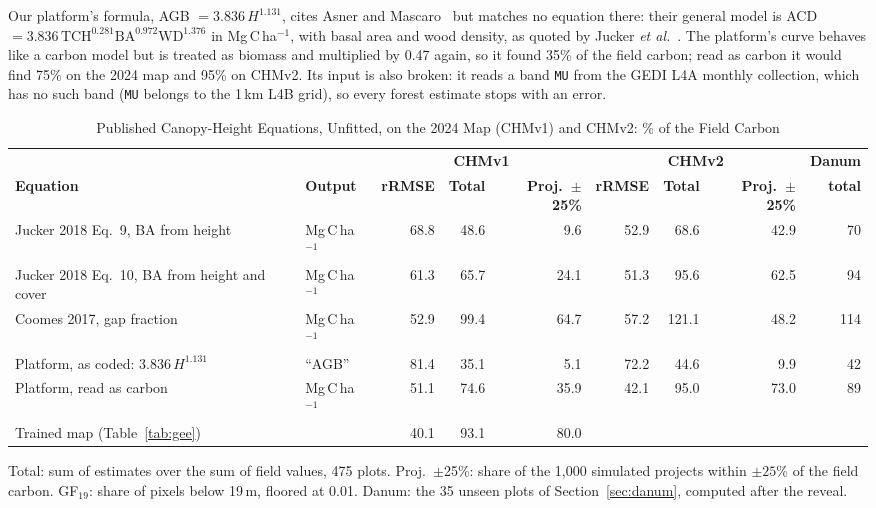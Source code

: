 \documentclass[conference,a4paper]{IEEEtran}
\begin{document}
Our platform's formula, AGB $=3.836\,H^{1.131}$, cites Asner and Mascaro~\cite{asner2014mapping} but matches no equation there: their general model is ACD $=3.836\,\mathrm{TCH}^{0.281}\mathrm{BA}^{0.972}\mathrm{WD}^{1.376}$ in Mg\,C\,ha$^{-1}$, with basal area and wood density, as quoted by Jucker \textit{et al.}~\cite{jucker2018estimating}. The platform's curve behaves like a carbon model but is treated as biomass and multiplied by 0.47 again, so it found 35\% of the field carbon; read as carbon it would find 75\% on the 2024 map and 95\% on CHMv2. Its input is also broken: it reads a band \texttt{MU} from the GEDI L4A monthly collection, which has no such band (\texttt{MU} belongs to the 1\,km L4B grid), so every forest estimate stops with an error.

\begin{table}[t]
\centering
\caption{Published Canopy-Height Equations, Unfitted, on the 2024 Map (CHMv1) and CHMv2: \% of the Field Carbon}
\label{tab:heighteq}
\footnotesize
\setlength{\tabcolsep}{4pt}
\begin{tabular}{@{}l l r r r r r r r@{}}
\toprule
 & & \multicolumn{3}{c}{\textbf{CHMv1}} & \multicolumn{3}{c}{\textbf{CHMv2}} & \textbf{Danum}\\
\textbf{Equation} & \textbf{Output} & \textbf{rRMSE} & \textbf{Total} & \textbf{Proj.\ $\pm$25\%} & \textbf{rRMSE} & \textbf{Total} & \textbf{Proj.\ $\pm$25\%} & \textbf{total}\\
\midrule
Jucker 2018 Eq.~9, BA from height & Mg\,C\,ha$^{-1}$ & 68.8 & 48.6 & 9.6 & 52.9 & 68.6 & 42.9 & 70\\
Jucker 2018 Eq.~10, BA from height and cover & Mg\,C\,ha$^{-1}$ & 61.3 & 65.7 & 24.1 & 51.3 & 95.6 & 62.5 & 94\\
Coomes 2017, gap fraction & Mg\,C\,ha$^{-1}$ & 52.9 & 99.4 & 64.7 & 57.2 & 121.1 & 48.2 & 114\\
Platform, as coded: $3.836\,H^{1.131}$ & ``AGB'' & 81.4 & 35.1 & 5.1 & 72.2 & 44.6 & 9.9 & 42\\
Platform, read as carbon & Mg\,C\,ha$^{-1}$ & 51.1 & 74.6 & 35.9 & 42.1 & 95.0 & 73.0 & 89\\
\midrule
Trained map (Table~\ref{tab:gee}) & & 40.1 & 93.1 & 80.0 & & & & \\
\bottomrule
\end{tabular}

\vspace{2pt}
{\scriptsize Total: sum of estimates over the sum of field values, 475 plots. Proj.\ $\pm$25\%: share of the 1{,}000 simulated projects within $\pm25$\% of the field carbon. GF$_{19}$: share of pixels below 19\,m, floored at 0.01. Danum: the 35 unseen plots of Section~\ref{sec:danum}, computed after the reveal.\par}
\end{table}
\end{document}
